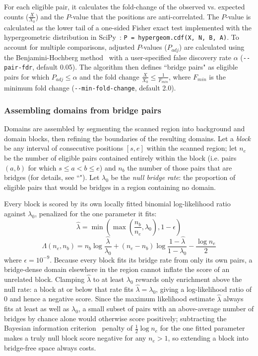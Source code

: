 \documentclass{article}
\begin{document}
For each eligible pair, it calculates the fold-change of the observed vs. expected counts ($\frac{X}{X_0}$) and the $P$-value that the positions are anti-correlated.
The $P$-value is calculated as the lower tail of a one-sided Fisher exact test implemented with the hypergeometric distribution in SciPy~\cite{Virtanen2020}: \verb|P = hypergeom.cdf(X, N, B, A)|.
To account for multiple comparisons, adjusted $P$-values ($P_{adj}$) are calculated using the Benjamini-Hochberg method~\cite{Benjamini1995} with a user-specified false discovery rate $\alpha$ (\verb|--pair-fdr|, default 0.05).
The algorithm then defines ``bridge pairs" as eligible pairs for which $P_{adj} \le \alpha$ and the fold change $\frac{X}{X_0} \le \frac{1}{F_{min}}$, where $F_{min}$ is the minimum fold change (\verb|--min-fold-change|, default 2.0).

\subsubsection{Assembling domains from bridge pairs}

Domains are assembled by segmenting the scanned region into background and domain blocks, then refining the boundaries of the resulting domains.
Let a \textit{block} be any interval of consecutive positions $[s, e]$ within the scanned region; let $n_e$ be the number of eligible pairs contained entirely within the block (i.e. pairs $(a, b)$ for which $s \le a < b \le e$) and $n_b$ the number of those pairs that are bridges (for details, see ``").
Let $\lambda_0$ be the \textit{null bridge rate}: the proportion of eligible pairs that would be bridges in a region containing no domain.

Every block is scored by its own locally fitted binomial log-likelihood ratio against $\lambda_0$, penalized for the one parameter it fits:
\begin{equation}
    \hat{\lambda} = \min{\left(\max{\left(\frac{n_b}{n_e}, \lambda_0\right)}, 1 - \epsilon\right)}
\end{equation}
\begin{equation}
    \Lambda(n_e, n_b) = n_b\log{\frac{\hat{\lambda}}{\lambda_0}} + (n_e - n_b)\log{\frac{1 - \hat{\lambda}}{1 - \lambda_0}} - \frac{\log{n_e}}{2}
\end{equation}
where $\epsilon = 10^{-9}$.
Because every block fits its bridge rate from only its own pairs, a bridge-dense domain elsewhere in the region cannot inflate the score of an unrelated block.
Clamping $\hat{\lambda}$ to at least $\lambda_0$ rewards only enrichment above the null rate: a block at or below that rate fits $\hat{\lambda} = \lambda_0$, giving a log-likelihood ratio of 0 and hence a negative score.
Since the maximum likelihood estimate $\hat{\lambda}$ always fits at least as well as $\lambda_0$, a small subset of pairs with an above-average number of bridges by chance alone would otherwise score positively; subtracting the Bayesian information criterion~\cite{Schwarz1978} penalty of $\frac{1}{2}\log{n_e}$ for the one fitted parameter makes a truly null block score negative for any $n_e > 1$, so extending a block into bridge-free space always costs.
\end{document}
